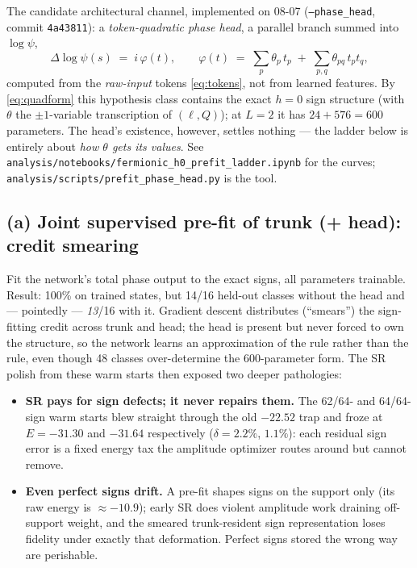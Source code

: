 \documentclass[11pt]{article}
\newcommand{\file}[1]{\texttt{#1}}
\begin{document}
The candidate architectural channel, implemented on 08-07
(\texttt{--phase\_head}, commit \texttt{4a43811}): a \emph{token-quadratic
phase head}, a parallel branch summed into $\log\psi$,
\begin{equation}
\Delta\log\psi(s) \;=\; i\,\varphi(t),\qquad
\varphi(t) \;=\; \sum_p \theta_p\, t_p \;+\; \sum_{p,q} \theta_{pq}\, t_p t_q ,
\label{eq:head}
\end{equation}
computed from the \emph{raw-input} tokens \eqref{eq:tokens}, not from learned
features. By \eqref{eq:quadform} this hypothesis class contains the exact
$h=0$ sign structure (with $\theta$ the $\pm1$-variable transcription of
$(\ell,Q)$); at $L=2$ it has $24+576=600$ parameters. The head's existence,
however, settles nothing --- the ladder below is entirely about \emph{how
$\theta$ gets its values}. See
\file{analysis/notebooks/fermionic\_h0\_prefit\_ladder.ipynb} for the curves;
\file{analysis/scripts/prefit\_phase\_head.py} is the tool.

\subsection{(a) Joint supervised pre-fit of trunk (+ head): credit smearing}
Fit the network's total phase output to the exact signs, all parameters
trainable. Result: 100\% on trained states, but 14/16 held-out classes
without the head and --- pointedly --- \emph{13}/16 with it. Gradient descent
distributes (``smears'') the sign-fitting credit across trunk and head; the
head is present but never forced to own the structure, so the network learns
an approximation of the rule rather than the rule, even though 48 classes
over-determine the 600-parameter form. The SR polish from these warm starts
then exposed two deeper pathologies:
\begin{itemize}
\item \textbf{SR pays for sign defects; it never repairs them.} The 62/64-
and 64/64-sign warm starts blew straight through the old $-22.52$ trap and
froze at $E=-31.30$ and $-31.64$ respectively ($\delta = 2.2\%$, $1.1\%$):
each residual sign error is a fixed energy tax the amplitude optimizer
routes around but cannot remove.
\item \textbf{Even perfect signs drift.} A pre-fit shapes signs on the
support only (its raw energy is $\approx-10.9$); early SR does violent
amplitude work draining off-support weight, and the smeared trunk-resident
sign representation loses fidelity under exactly that deformation. Perfect
signs stored the wrong way are perishable.
\end{itemize}
\end{document}
